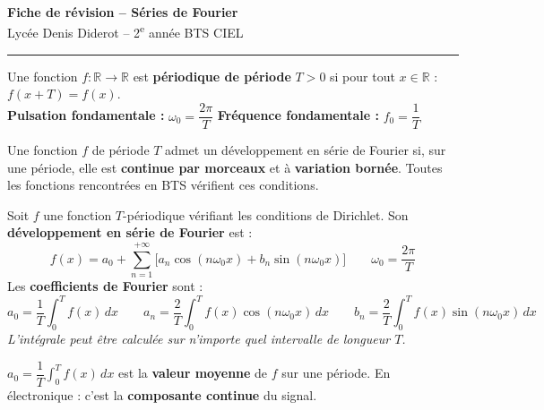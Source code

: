 \documentclass[a4paper,11pt]{article}
\newcommand{\R}{\mathbb{R}}
\newcommand{\w}{\omega_0}
\begin{document}

\begin{center}
  {\LARGE \textbf{Fiche de révision -- Séries de Fourier}} \\[0.2cm]
  {\large Lycée Denis Diderot -- 2\textsuperscript{e} année BTS CIEL} \\[0.2cm]
  \rule{0.65\textwidth}{0.4pt}
\end{center}

\vspace{0.3cm}

\begin{tcolorbox}[formulebox={1 — Fonctions périodiques : rappels}]
Une fonction $f:\R\to\R$ est \textbf{périodique de période} $T>0$ si pour tout $x\in\R$ : $f(x+T)=f(x)$.\\[3pt]
\textbf{Pulsation fondamentale :} $\omega_0 = \dfrac{2\pi}{T}$ \hfill
\textbf{Fréquence fondamentale :} $f_0 = \dfrac{1}{T}$
\end{tcolorbox}

\begin{tcolorbox}[remarquebox={Condition de Dirichlet (admis)}]
Une fonction $f$ de période $T$ admet un développement en série de Fourier si, sur une période, elle est \textbf{continue par morceaux} et à \textbf{variation bornée}. Toutes les fonctions rencontrées en BTS vérifient ces conditions.
\end{tcolorbox}

\vspace{0.2cm}

\begin{tcolorbox}[formulebox={2 — Développement en série de Fourier}]
Soit $f$ une fonction $T$-périodique vérifiant les conditions de Dirichlet. Son \textbf{développement en série de Fourier} est :
\[
  \boxed{f(x) = a_0 + \sum_{n=1}^{+\infty}\Big[a_n\cos(n\w x) + b_n\sin(n\w x)\Big]}
  \qquad \omega_0 = \frac{2\pi}{T}
\]
Les \textbf{coefficients de Fourier} sont :
\[
  a_0 = \frac{1}{T}\int_0^T f(x)\,dx
  \qquad
  a_n = \frac{2}{T}\int_0^T f(x)\cos(n\w x)\,dx
  \qquad
  b_n = \frac{2}{T}\int_0^T f(x)\sin(n\w x)\,dx
\]
\textit{L'intégrale peut être calculée sur n'importe quel intervalle de longueur $T$.}
\end{tcolorbox}

\begin{tcolorbox}[remarquebox={Interprétation de $a_0$}]
$a_0 = \dfrac{1}{T}\displaystyle\int_0^T f(x)\,dx$ est la \textbf{valeur moyenne} de $f$ sur une période.
En électronique : c'est la \textbf{composante continue} du signal.
\end{tcolorbox}
\end{document}
